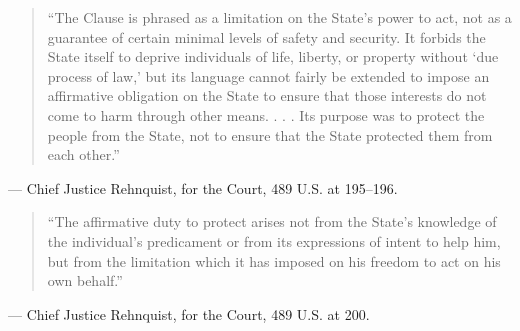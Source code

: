 \documentclass[12pt]{article}
\begin{document}
\begin{quote}
``The Clause is phrased as a limitation on the State's power to act, not as a guarantee of certain minimal levels of safety and security. It forbids the State itself to deprive individuals of life, liberty, or property without `due process of law,' but its language cannot fairly be extended to impose an affirmative obligation on the State to ensure that those interests do not come to harm through other means. . . . Its purpose was to protect the people from the State, not to ensure that the State protected them from each other.''
\end{quote}
\noindent --- Chief Justice Rehnquist, for the Court, 489 U.S. at 195--196.

\begin{quote}
``The affirmative duty to protect arises not from the State's knowledge of the individual's predicament or from its expressions of intent to help him, but from the limitation which it has imposed on his freedom to act on his own behalf.''
\end{quote}
\noindent --- Chief Justice Rehnquist, for the Court, 489 U.S. at 200.
\end{document}
